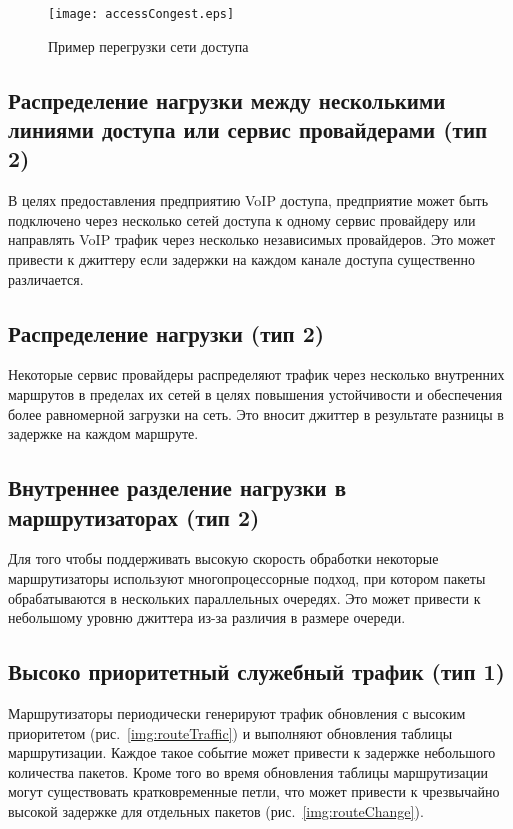 \begin{figure} [h]
  \center
\texttt{[image: accessCongest.eps]}
  \caption{Пример перегрузки сети доступа \cite{clark}}
  \label{img:accessCongest}
\end{figure}

\subsection{Распределение нагрузки между несколькими линиями доступа или сервис провайдерами (тип 2) } \label{subsect2_1_4}
В целях предоставления предприятию VoIP доступа, предприятие может быть подключено через несколько сетей доступа к одному сервис провайдеру или направлять VoIP трафик через несколько независимых провайдеров. Это может привести к джиттеру если задержки на каждом канале доступа существенно различается.

\subsection{Распределение нагрузки (тип 2) } \label{subsect2_1_5}
Некоторые сервис провайдеры распределяют трафик через несколько внутренних маршрутов в пределах их сетей в целях повышения устойчивости и обеспечения более равномерной загрузки на сеть. Это вносит джиттер в результате разницы в задержке на каждом маршруте.

\subsection{Внутреннее разделение нагрузки в маршрутизаторах (тип 2) } \label{subsect2_1_6}
Для того чтобы поддерживать высокую скорость обработки некоторые маршрутизаторы используют многопроцессорные подход, при котором пакеты обрабатываются в нескольких параллельных очередях. Это может привести к небольшому уровню джиттера из-за различия в размере очереди.

\subsection{Высоко приоритетный служебный трафик (тип 1) } \label{subsect2_1_7}
Маршрутизаторы периодически генерируют трафик обновления с высоким приоритетом (рис. \ref{img:routeTraffic}) и выполняют обновления таблицы маршрутизации. Каждое такое событие может привести к задержке небольшого количества пакетов. Кроме того во время обновления таблицы маршрутизации могут существовать кратковременные петли, что может привести к чрезвычайно высокой задержке для отдельных пакетов (рис. \ref{img:routeChange}).

